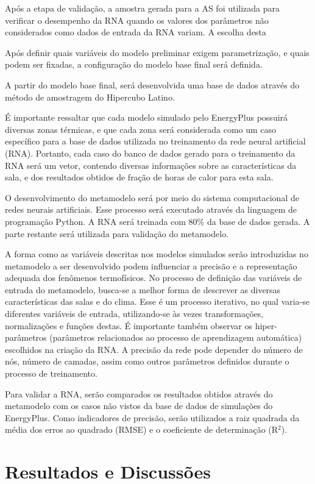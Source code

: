\documentclass[brazil,hardcopy,openany,a5paper]{ufscthesis}
\begin{document}
	Após a etapa de validação, a amostra gerada para a AS foi utilizada para verificar o desempenho da RNA quando os valores dos parâmetros não considerados como dados de entrada da RNA variam. A escolha desta 
	
	Após definir quais variáveis do modelo preliminar exigem parametrização, e quais podem ser fixadas, a configuração do modelo base final será definida.
	
	A partir do modelo base final, será desenvolvida uma base de dados através do método de amostragem do Hipercubo Latino.
	
	É importante ressaltar que cada modelo simulado pelo EnergyPlus possuirá diversas zonas térmicas, e que cada zona será considerada como um caso específico para a base de dados utilizada no treinamento da rede neural artificial (RNA). Portanto, cada caso do banco de dados gerado para o treinamento da RNA será um vetor, contendo diversas informações sobre as características da sala, e dos resultados obtidos de fração de horas de calor para esta sala.
	
	O desenvolvimento do metamodelo será por meio do sistema computacional de redes neurais artificiais. Esse processo será executado através da linguagem de programação Python. A RNA será treinada com 80\% da base de dados gerada. A parte restante será utilizada para validação do metamodelo.
	
	A forma como as variáveis descritas nos modelos simulados serão introduzidas no metamodelo a ser desenvolvido podem influenciar a precisão e a representação adequada dos fenômenos termofísicos. No processo de definição das variáveis de entrada do metamodelo, busca-se a melhor forma de descrever as diversas características das salas e do clima. Esse é um processo iterativo, no qual varia-se diferentes variáveis de entrada, utilizando-se às vezes transformações, normalizações e funções destas. É importante também observar os hiper-parâmetros (parâmetros relacionados ao processo de aprendizagem automática) escolhidos na criação da RNA. A precisão da rede pode depender do número de nós, número de camadas, assim como outros parâmetros definidos durante o processo de treinamento.
	
	Para validar a RNA, serão comparados os resultados obtidos através do metamodelo com os casos não vistos da base de dados de simulações do EnergyPlus. Como indicadores de precisão, serão utilizados a raiz quadrada da média dos erros ao quadrado (RMSE) e o coeficiente de determinação (R$^2$).

\chapter{Resultados e Discussões}
\label{chapter:resultados}
\end{document}
